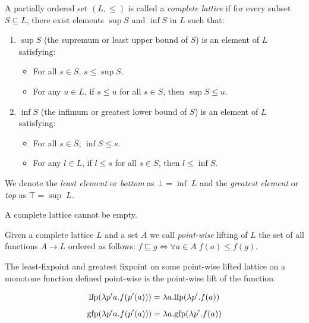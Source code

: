 \documentclass[
  10pt,       %
  twoside,    %
  a4paper,    %
  english,    %
  tikz,       %
  openright,  %
]{book}
\begin{document}
\begin{definition}
  A partially ordered set \((L, \leq)\) is called a \emph{complete lattice} if
  for every subset \(S \subseteq L\), there exist elements \(\sup S\) and
  \(\inf S\) in \(L\) such that: 
  \begin{enumerate}
    \item \(\sup S\) (the supremum or least upper bound of \(S\)) is an
      element of \(L\) satisfying: 
      \begin{itemize}
        \item For all \(s \in S\), \(s \leq \sup S\).
        \item For any \(u \in L\), if \(s \leq u\) for all \(s \in S\), then
          \(\sup S \leq u\). \end{itemize}
    \item \(\inf S\) (the infimum or greatest lower bound of \(S\)) is an
      element of \(L\) satisfying: 
      \begin{itemize}
        \item For all \(s \in S\), \(\inf S \leq s\).
        \item For any \(l \in L\), if \(l \leq s\) for all \(s \in S\), then
          \(l \leq \inf S\). 
      \end{itemize}
  \end{enumerate}

  We denote the \textit{least element} or \textit{bottom} as $\bot = \inf \; L$ 
  and the \textit{greatest element} or \textit{top} as $\top = \sup \; L$.
\end{definition}

\begin{observation}
  A complete lattice cannot be empty.
\end{observation}

\begin{definition}
  Given a complete lattice $L$ and a set $A$ we call \textit{point-wise} lifting
  of $L$ the set of all functions $A \to L$ ordered as follows: $f \sqsubseteq 
  g \iff \forall a \in A \; f(a) \leq f(g)$.
\end{definition}

\begin{observation}
  \label{th:pointfix}
  The least-fixpoint and greatest fixpoint on some point-wise lifted lattice on 
  a monotone function defined point-wise is the point-wise lift of the function.

  $$\mathrm{lfp}(\lambda p' a . f(p'(a))) = \lambda a . \mathrm{lfp}(\lambda p' . f(a))$$
  $$\mathrm{gfp}(\lambda p' a . f(p'(a))) = \lambda a . \mathrm{gfp}(\lambda p' . f(a))$$
\end{observation}
\end{document}

